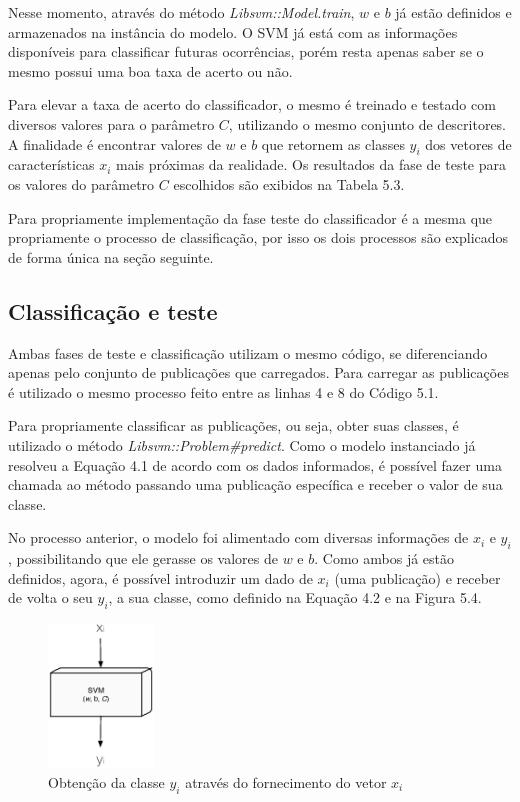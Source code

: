 Nesse momento, através do método \textit{Libsvm::Model.train}, $w$ e $b$ já estão definidos e armazenados na instância do modelo. O SVM já está com as informações disponíveis para classificar futuras ocorrências, porém resta apenas saber se o mesmo possui uma boa taxa de acerto ou não. 

Para elevar a taxa de acerto do classificador, o mesmo é treinado e testado com diversos valores para o parâmetro $C$, utilizando o mesmo conjunto de descritores. A finalidade é encontrar valores de $w$ e $b$ que retornem as classes ${y}_{i}$ dos vetores de características ${x}_{i}$ mais próximas da realidade. Os resultados da fase de teste para os valores do parâmetro $C$ escolhidos são exibidos na Tabela 5.3.

Para propriamente implementação da fase teste do classificador é a mesma que propriamente o processo de classificação, por isso os dois processos são explicados de forma única na seção seguinte.

\subsection*{Classificação e teste}

Ambas fases de teste e classificação utilizam o mesmo código, se diferenciando apenas pelo conjunto de publicações que carregados. Para carregar as publicações é utilizado o mesmo processo feito entre as linhas 4 e 8 do Código 5.1.

Para propriamente classificar as publicações, ou seja, obter suas classes, é utilizado o método \textit{Libsvm::Problem\#predict}. Como o modelo instanciado já resolveu a Equação 4.1 de acordo com os dados informados, é possível fazer uma chamada ao método passando uma publicação específica e receber o valor de sua classe.

No processo anterior, o modelo foi alimentado com diversas informações de ${x}_{i}$ e ${y}_{i}$, possibilitando que ele gerasse os valores de $w$ e $b$. Como ambos já estão definidos, agora, é possível introduzir um dado de ${x}_{i}$ (uma publicação) e receber de volta o seu ${y}_{i}$, a sua classe, como definido na Equação 4.2 e na Figura 5.4.

\begin{figure}[htpb]
  \begin{center}
    \includegraphics[width=0.25\textwidth]{figuras/svm-testexiyi.eps}
    \caption{Obtenção da classe ${y}_{i}$ através do fornecimento do vetor ${x}_{i}$}
  \end{center}
\end{figure}


